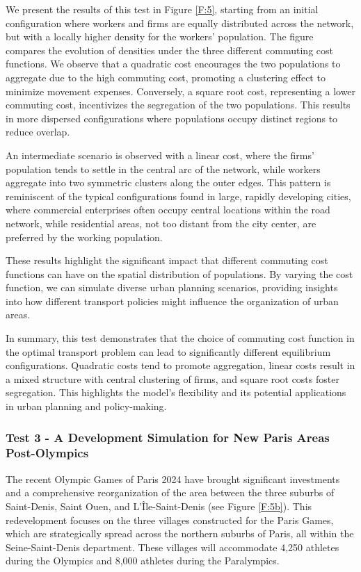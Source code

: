 \documentclass[smallextended,referee,envcountsect,]{svjour3}
\begin{document}
We present the results of this test in Figure \ref{F:5}, starting from an initial configuration where workers and firms are equally distributed across the network, but with a locally higher density for the workers' population. The figure compares the evolution of densities under the three different commuting cost functions. We observe that a quadratic cost encourages the two populations to aggregate due to the high commuting cost, promoting a clustering effect to minimize movement expenses. Conversely, a square root cost, representing a lower commuting cost, incentivizes the segregation of the two populations. This results in more dispersed configurations where populations occupy distinct regions to reduce overlap.

An intermediate scenario is observed with a linear cost, where the firms' population tends to settle in the central arc of the network, while workers aggregate into two symmetric clusters along the outer edges. This pattern is reminiscent of the typical configurations found in large, rapidly developing cities, where commercial enterprises often occupy central locations within the road network, while residential areas, not too distant from the city center, are preferred by the working population.

These results highlight the significant impact that different commuting cost functions can have on the spatial distribution of populations. By varying the cost function, we can simulate diverse urban planning scenarios, providing insights into how different transport policies might influence the organization of urban areas.

In summary, this test demonstrates that the choice of commuting cost function in the optimal transport problem can lead to significantly different equilibrium configurations. Quadratic costs tend to promote aggregation, linear costs result in a mixed structure with central clustering of firms, and square root costs foster segregation. This highlights the model's flexibility and its potential applications in urban planning and policy-making.


\subsubsection{Test 3 - A Development Simulation for New Paris Areas Post-Olympics}

The recent Olympic Games of Paris 2024 have brought significant investments and a comprehensive reorganization of the area between the three suburbs of Saint-Denis, Saint Ouen, and L'Île-Saint-Denis (see Figure \ref{F:5b}). This redevelopment focuses on the three villages constructed for the Paris Games, which are strategically spread across the northern suburbs of Paris, all within the Seine-Saint-Denis department. These villages will accommodate 4,250 athletes during the Olympics and 8,000 athletes during the Paralympics.
\end{document}
